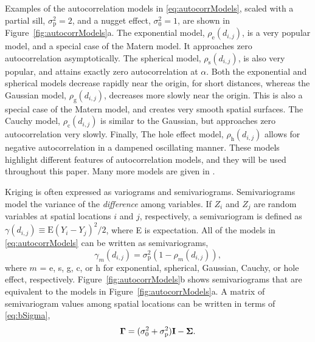 \documentclass[11pt, titlepage]{article}\usepackage[]{graphicx}\usepackage[]{color}
\begin{document}
\begin{spacing}{1.9}
\begin{flushleft}
Examples of the autocorrelation models in \ref{eq:autocorrModels}, scaled with a partial sill, $\sigma^2_{\textrm{p}} = 2$, and a nugget effect, $\sigma^2_0 = 1$, are shown in Figure~\ref{fig:autocorrModels}a.  The exponential model, $\rho_{\textrm{e}}(d_{i,j})$, is a very popular model, and a special case of the Matern model.  It approaches zero autocorrelation asymptotically. The spherical model, $\rho_{\textrm{s}}(d_{i,j})$, is also very popular, and attains exactly zero autocorrelation at $\alpha$.  Both the exponential and spherical models decrease rapidly near the origin, for short distances, whereas the Gaussian model, $\rho_{\textrm{g}}(d_{i,j})$, decreases more slowly near the origin. This is also a special case of the Matern model, and creates very smooth spatial surfaces. The Cauchy model, $\rho_{\textrm{c}}(d_{i,j})$ is similar to the Gaussian, but approaches zero autocorrelation very slowly. Finally, The hole effect model, $\rho_{\textrm{h}}(d_{i,j})$ allows for negative autocorrelation in a dampened oscillating manner. These models highlight different features of autocorrelation models, and they will be used throughout this paper. Many more models are given in \citet[][p. 80--93]{Chil:Delf:geos:1999}.  

Kriging is often expressed as variograms and semivariograms.  Semivariograms model the variance of the \emph{difference} among variables. If $Z_i$ and $Z_j$ are random variables at spatial locations $i$ and $j$, respectively, a semivariogram is defined as $\gamma(d_{i,j}) \equiv \textrm{E}(Y_i - Y_j)^2/2$, where E is expectation.  All of the models in \ref{eq:autocorrModels} can be written as semivariograms,
\begin{equation} \label{eq:semivarrho}
				\gamma_m(d_{i,j}) = \sigma^2_\textrm{p}(1 - \rho_m(d_{i,j})),
\end{equation}
where $m$ = e, s, g, c, or h for exponential, spherical, Gaussian, Cauchy, or hole effect, respectively. Figure~\ref{fig:autocorrModels}b shows semivariograms that are equivalent to the models in Figure~\ref{fig:autocorrModels}a.  A matrix of semivariogram values among spatial locations can be written in terms of \ref{eq:bSigma},
\[
\mbox{\boldmath $\Gamma$} = (\sigma_0^2 + \sigma^2_{\textrm{p}})\mathbf{I} - \mbox{\boldmath $\Sigma$}.
\]


\end{flushleft}
\end{spacing}
\end{document}
